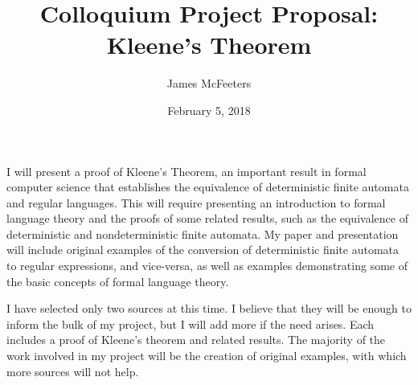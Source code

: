 \documentclass[12 pt, letterpaper]{article}
\author{James McFeeters}
\title{Colloquium Project Proposal: Kleene's Theorem}
\date{February 5, 2018}
\begin{document}
\maketitle

\setlength{\parindent}{0 pt}
\setlength{\parskip}{1 em}

I will present a proof of Kleene's Theorem, an important result in formal computer science that establishes the equivalence of deterministic finite automata and regular languages.
This will require presenting an introduction to formal language theory and the proofs of some related results, such as the equivalence of deterministic and nondeterministic finite automata. 
My paper and presentation will include original examples of the conversion of deterministic finite automata to regular expressions, and vice-versa, as well as examples demonstrating some of the basic concepts of formal language theory.

I have selected only two sources at this time. 
I believe that they will be enough to inform the bulk of my project, but I will add more if the need arises. 
Each includes a proof of Kleene's theorem and related results.
The majority of the work involved in my project will be the creation of original examples, with which more sources will not help.

\clearpage
\nocite{*}


\end{document}
